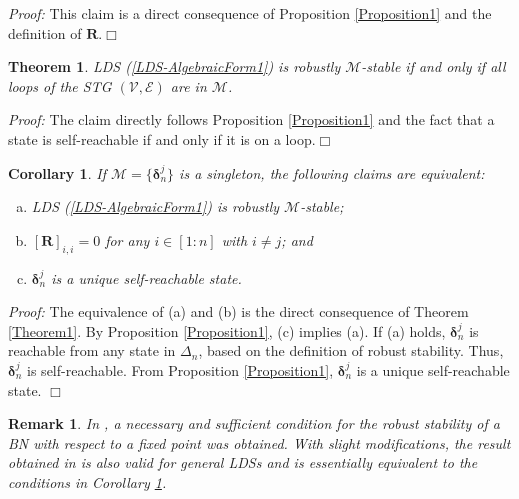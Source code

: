 \documentclass[11pt,onecolumn]{article}
\newtheorem{theorem}{Theorem}
\newtheorem{corollary}{Corollary}
\newtheorem{remark}{Remark}
\newcommand{\ddelta}{{\boldsymbol\delta}}
\begin{document}
{\it Proof:} This claim is a direct consequence of Proposition \ref{Proposition1} and the definition of $\mathbf R$.\hfill$\Box$

\begin{theorem}\label{Theorem2}
    LDS (\ref{LDS-AlgebraicForm1}) is robustly $\mathcal M$-stable if and only if all loops of the STG $(\mathcal V,\mathcal E)$ are in $\mathcal M$.
\end{theorem}

{\it Proof:} The claim directly follows Proposition \ref{Proposition1} and the fact that a state is self-reachable if and only if it is on a loop.\hfill $\Box$


\begin{corollary}\label{Corollary2}
   If $\mathcal M=\{\ddelta_n^j\}$ is a singleton, the following claims are equivalent:
    \begin{enumerate}[(a)]
       \item  LDS (\ref{LDS-AlgebraicForm1}) is robustly $\mathcal M$-stable;
       \item  $[\mathbf R]_{i,i}=0$ for any $i\in[1:n]$ with $i\neq j$; and
       \item  $\ddelta_n^j$ is a unique self-reachable state.
    \end{enumerate}

\end{corollary}

{\it Proof:} The equivalence of (a) and (b) is the direct consequence of Theorem \ref{Theorem1}. By Proposition \ref{Proposition1}, (c) implies (a). If (a) holds, $\ddelta_n^j$ is reachable from any state in $\Delta_n$, based on the definition of robust stability. Thus, $\ddelta_n^j$ is self-reachable. From Proposition \ref{Proposition1}, $\ddelta_n^j$ is a unique self-reachable state. \hfill$\Box$



\begin{remark}
     In \cite{2017Global}, a necessary and sufficient condition for the robust stability of a BN with respect to a fixed point was obtained. With slight modifications, the result obtained in \cite{2017Global} is also valid for general LDSs and is essentially equivalent to the conditions in Corollary \ref{Corollary2}. %
\end{remark}
\end{document}

